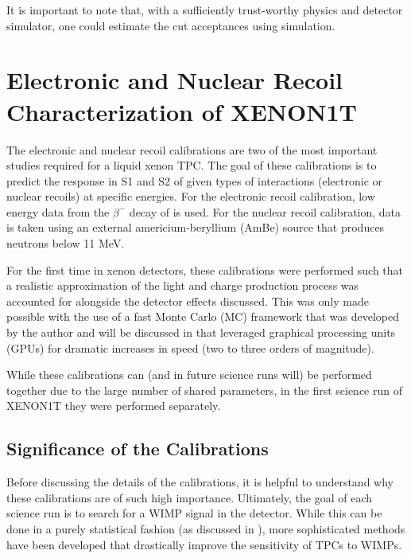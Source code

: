 It is important to note that, with a sufficiently trust-worthy physics and detector simulator, one could estimate the cut acceptances using simulation. 




\section{Electronic and Nuclear Recoil Characterization of XENON1T}
\label{sec:xe1t_er_nr_calibration}

The electronic and nuclear recoil calibrations are two of the most important studies required for a liquid xenon TPC.  The goal of these calibrations is to predict the response in S1 and S2 of given types of interactions (electronic or nuclear recoils) at specific energies.  For the electronic recoil calibration, low energy data from the $\beta^-$ decay of  is used.  For the nuclear recoil calibration, data is taken using an external americium-beryllium (AmBe) source that produces neutrons below 11 MeV.

For the first time in xenon detectors, these calibrations were performed such that a realistic approximation of the light and charge production process was accounted for alongside the detector effects discussed.  This was only made possible with the use of a fast Monte Carlo (MC) framework that was developed by the author and will be discussed in  that leveraged graphical processing units (GPUs) for dramatic increases in speed (two to three orders of magnitude).

While these calibrations can (and in future science runs will) be performed together due to the large number of shared parameters, in the first science run of XENON1T they were performed separately.  


\subsection{Significance of the Calibrations}

Before discussing the details of the calibrations, it is helpful to understand why these calibrations are of such high importance.  Ultimately, the goal of each science run is to search for a WIMP signal in the detector.  While this can be done in a purely statistical fashion (as discussed in ), more sophisticated methods have been developed that drastically improve the sensitivity of TPCs to WIMPs.  

